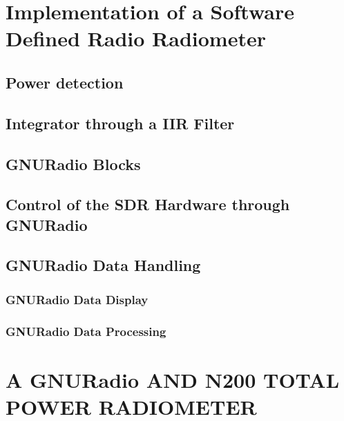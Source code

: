 \chapter{Implementation of a Software Defined Radio Radiometer}
\section{Power detection}

\section{Integrator through a IIR Filter}

\section{GNURadio Blocks}

\section{Control of the SDR Hardware through GNURadio}

\section{GNURadio Data Handling}

\subsection{GNURadio Data Display}

\subsection{GNURadio Data Processing}

\chapter{A GNURadio AND N200 TOTAL POWER RADIOMETER}

